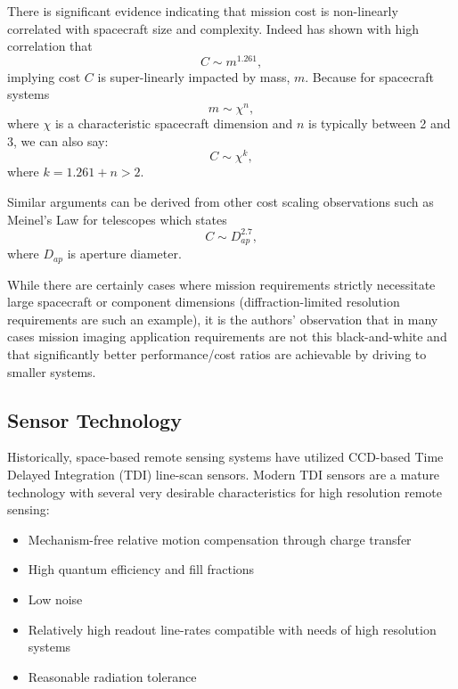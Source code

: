 \documentclass[10pt,journal]{IEEEtran}  %
\begin{document}
There is significant evidence indicating that mission cost is non-linearly correlated with spacecraft size and complexity.  Indeed \cite{bearden} has shown with high correlation that 
\begin{equation*}
    C \sim m^{1.261},
\end{equation*}
implying cost $C$ is super-linearly impacted by mass, $m$.  Because for spacecraft systems
\begin{equation*}
    m \sim \chi^n,
\end{equation*}
where $\chi$ is a characteristic spacecraft dimension and $n$ is typically between 2 and 3, we can also say:
\begin{equation}
C \sim \chi^k,
\end{equation}
where $k = 1.261 + n > 2$.

Similar arguments can be derived from other cost scaling observations such as Meinel's Law \cite{meinel} for telescopes which states
\begin{equation*}
    C \sim D_{ap}^{2.7},
\end{equation*}
where $D_{ap}$ is aperture diameter.

While there are certainly cases where mission requirements strictly necessitate large spacecraft or component dimensions (diffraction-limited resolution requirements are such an example), it is the authors' observation that in many cases mission imaging application requirements are not this black-and-white and that significantly better performance/cost ratios are achievable by driving to smaller systems.

\subsection{Sensor Technology}
\label{sec:sensor_trends}

Historically, space-based remote sensing systems have utilized CCD-based Time Delayed Integration (TDI) line-scan sensors.  Modern TDI sensors are a mature technology with several very desirable characteristics for high resolution remote sensing:

\begin{itemize}
    \item Mechanism-free relative motion compensation through charge transfer
    \item High quantum efficiency and fill fractions
    \item Low noise
    \item Relatively high readout line-rates compatible with needs of high resolution systems
    \item Reasonable radiation tolerance
\end{itemize}
\end{document}

